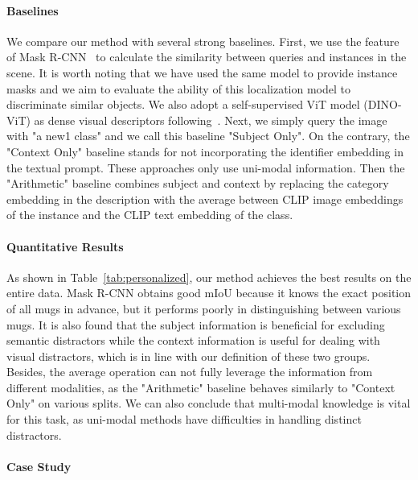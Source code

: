 \documentclass[letterpaper]{article} \usepackage[submission]{aaai24}  \usepackage{times}  \usepackage{helvet}  \usepackage{courier}  \usepackage[hyphens]{url}  \usepackage{graphicx} \urlstyle{rm} \def\UrlFont{\rm}  \usepackage{natbib}  \usepackage{caption} \frenchspacing  \setlength{\pdfpagewidth}{8.5in} \setlength{\pdfpageheight}{11in} \usepackage{algorithm}
\begin{document}
\paragraph{Baselines}

We compare our method with several strong baselines. 
First, we use the feature of Mask R-CNN~\cite{maskrcnn} to calculate the similarity between queries and instances in the scene.
It is worth noting that we have used the same model to provide instance masks and we aim to evaluate the ability of this localization model to discriminate similar objects.
We also adopt a self-supervised ViT model (DINO-ViT) as dense visual descriptors following~\cite{dino}.
Next, we simply query the image with "a new1 class" and we call this baseline "Subject Only".
On the contrary, the "Context Only" baseline stands for not incorporating the identifier embedding in the textual prompt.
These approaches only use uni-modal information.
Then the "Arithmetic" baseline combines subject and context by replacing the category embedding in the description with the average between CLIP image embeddings of the instance and the CLIP text embedding of the class.

\paragraph{Quantitative Results}

As shown in Table~\ref{tab:personalized}, our method achieves the best results on the entire data.
Mask R-CNN obtains good mIoU because it knows the exact position of all mugs in advance, but it performs poorly in distinguishing between various mugs.
It is also found that the subject information is beneficial for excluding semantic distractors while the context information is useful for dealing with visual distractors, which is in line with our definition of these two groups.
Besides, the average operation can not fully leverage the information from different modalities, as the "Arithmetic" baseline behaves similarly to "Context Only" on various splits.
We can also conclude that multi-modal knowledge is vital for this task, as uni-modal methods have difficulties in handling distinct distractors.












\paragraph{Case Study}
\end{document}
